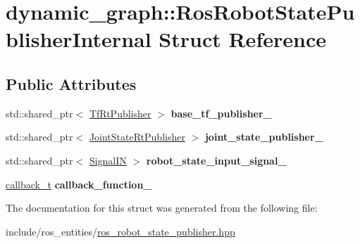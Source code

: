 \hypertarget{structdynamic__graph_1_1RosRobotStatePublisherInternal}{}\section{dynamic\+\_\+graph\+:\+:Ros\+Robot\+State\+Publisher\+Internal Struct Reference}
\label{structdynamic__graph_1_1RosRobotStatePublisherInternal}
\subsection*{Public Attributes}
\begin{DoxyCompactItemize}
\item 
\mbox{\label{structdynamic__graph_1_1RosRobotStatePublisherInternal_a99b630f10c0d338da1da2945f7c7f906}} 
std\+::shared\+\_\+ptr$<$ \hyperlink{namespacedynamic__graph_ac8d567b9a3d1ab846ba2efdc1ff1e120}{Tf\+Rt\+Publisher} $>$ {\bfseries base\+\_\+tf\+\_\+publisher\+\_\+}
\item 
\mbox{\label{structdynamic__graph_1_1RosRobotStatePublisherInternal_ac04f31a05e4c55eb8f28351af8f9cbf6}} 
std\+::shared\+\_\+ptr$<$ \hyperlink{namespacedynamic__graph_ae9ad83c8174a9aa5bc1688df02b4ee95}{Joint\+State\+Rt\+Publisher} $>$ {\bfseries joint\+\_\+state\+\_\+publisher\+\_\+}
\item 
\mbox{\label{structdynamic__graph_1_1RosRobotStatePublisherInternal_aacbcfcb6f326e672f555468111af7d56}} 
std\+::shared\+\_\+ptr$<$ \hyperlink{namespacedynamic__graph_ae1463c695a6915ea3f9ab4311beb527a}{Signal\+IN} $>$ {\bfseries robot\+\_\+state\+\_\+input\+\_\+signal\+\_\+}
\item 
\mbox{\label{structdynamic__graph_1_1RosRobotStatePublisherInternal_a2aa4d44e955ec44e762deb1059b3e3f7}} 
\hyperlink{namespacedynamic__graph_adf7d40f2a8d1425af80c14f90e58e961}{callback\+\_\+t} {\bfseries callback\+\_\+function\+\_\+}
\end{DoxyCompactItemize}


The documentation for this struct was generated from the following file\+:\begin{DoxyCompactItemize}
\item 
include/ros\+\_\+entities/\hyperlink{ros__robot__state__publisher_8hpp}{ros\+\_\+robot\+\_\+state\+\_\+publisher.\+hpp}\end{DoxyCompactItemize}
